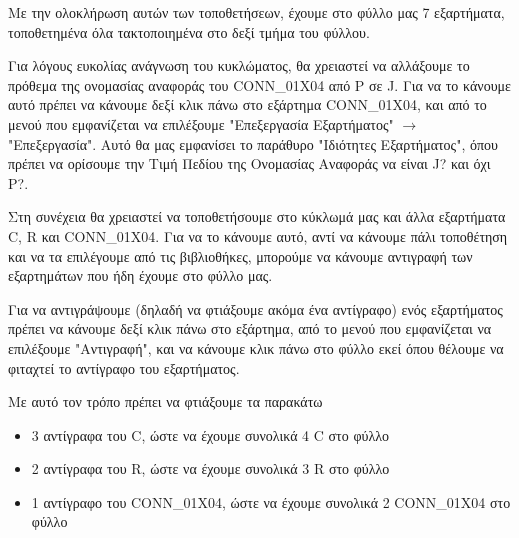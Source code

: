 \documentclass[a4paper]{article}
\begin{document}
Με την ολοκλήρωση αυτών των τοποθετήσεων, έχουμε στο φύλλο μας 7 εξαρτήματα, τοποθετημένα όλα τακτοποιημένα στο δεξί τμήμα του φύλλου.

\begin{figure}
  \begin{center}
    \label{fig:kicad-main}
  \end{center}
\end{figure}

Για λόγους ευκολίας ανάγνωση του κυκλώματος, θα χρειαστεί να αλλάξουμε το πρόθεμα της ονομασίας αναφοράς του CONN\_01X04 από P σε J. Για να το κάνουμε αυτό πρέπει να κάνουμε δεξί κλικ πάνω στο εξάρτημα CONN\_01X04, και από το μενού που εμφανίζεται να επιλέξουμε "Επεξεργασία Εξαρτήματος" $\rightarrow$ "Επεξεργασία". Αυτό θα μας εμφανίσει το παράθυρο "Ιδιότητες Εξαρτήματος", όπου πρέπει να ορίσουμε την Τιμή Πεδίου της Ονομασίας Αναφοράς να είναι J? και όχι P?.

\begin{figure}
  \begin{center}
    \label{fig:kicad-main}
  \end{center}
\end{figure}


Στη συνέχεια θα χρειαστεί να τοποθετήσουμε στο κύκλωμά μας και άλλα εξαρτήματα C, R και CONN\_01X04. Για να το κάνουμε αυτό, αντί να κάνουμε πάλι τοποθέτηση και να τα επιλέγουμε από τις βιβλιοθήκες, μπορούμε να κάνουμε αντιγραφή των εξαρτημάτων που ήδη έχουμε στο φύλλο μας. 

Για να αντιγράψουμε (δηλαδή να φτιάξουμε ακόμα ένα αντίγραφο) ενός εξαρτήματος πρέπει να κάνουμε δεξί κλικ πάνω στο εξάρτημα, από το μενού που εμφανίζεται να επιλέξουμε "Αντιγραφή", και να κάνουμε κλικ πάνω στο φύλλο εκεί όπου θέλουμε να φιταχτεί το αντίγραφο του εξαρτήματος. 

\begin{figure}
  \begin{center}
    \label{fig:kicad-main}
  \end{center}
\end{figure}

Με αυτό τον τρόπο πρέπει να φτιάξουμε τα παρακάτω

\begin{itemize}
    \item 3 αντίγραφα του C, ώστε να έχουμε συνολικά 4 C στο φύλλο
    \item 2 αντίγραφα του R, ώστε να έχουμε συνολικά 3 R στο φύλλο
    \item 1 αντίγραφο του CONN\_01X04, ώστε να έχουμε συνολικά 2 CONN\_01X04 στο φύλλο
\end{itemize}
\end{document}
